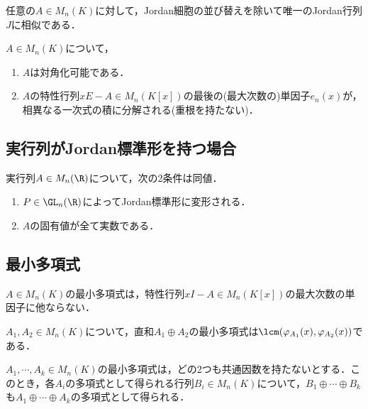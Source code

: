 \documentclass[uplatex, dvipdfmx]{jsreport}
\begin{document}
\begin{theorem}[Jordan標準形]
    任意の$A\in M_n(K)$に対して，Jordan細胞の並び替えを除いて唯一のJordan行列$J$に相似である．
\end{theorem}

\begin{corollary}[対角化可能性の単因子による特徴付け]
    $A\in M_n(K)$について，
    \begin{enumerate}
        \item $A$は対角化可能である．
        \item $A$の特性行列$xE-A\in M_n(K[x])$の最後の(最大次数の)単因子$e_n(x)$が，相異なる一次式の積に分解される(重根を持たない)．
    \end{enumerate}
\end{corollary}

\subsection{実行列がJordan標準形を持つ場合}

\begin{theorem}
    実行列$A\in M_n(\R)$について，次の2条件は同値．
    \begin{enumerate}
        \item $P\in\GL_n(\R)$によってJordan標準形に変形される．
        \item $A$の固有値が全て実数である．
    \end{enumerate}
\end{theorem}

\subsection{最小多項式}

\begin{theorem}
    $A\in M_n(K)$の最小多項式は，特性行列$xI-A\in M_n(K[x])$の最大次数の単因子に他ならない．
\end{theorem}

\begin{proposition}[直和の最小多項式]
    $A_1,A_2\in M_n(K)$について，直和$A_1\oplus A_2$の最小多項式は$\lcm(\varphi_{A_1}(x),\varphi_{A_2}(x))$である．
\end{proposition}

\begin{proposition}
    $A_1,\cdots,A_k\in M_n(K)$の最小多項式は，どの2つも共通因数を持たないとする．このとき，各$A_i$の多項式として得られる行列$B_i\in M_n(K)$について，$B_1\oplus\cdots\oplus B_k$も$A_1\oplus\cdots\oplus A_k$の多項式として得られる．
\end{proposition}
\end{document}
